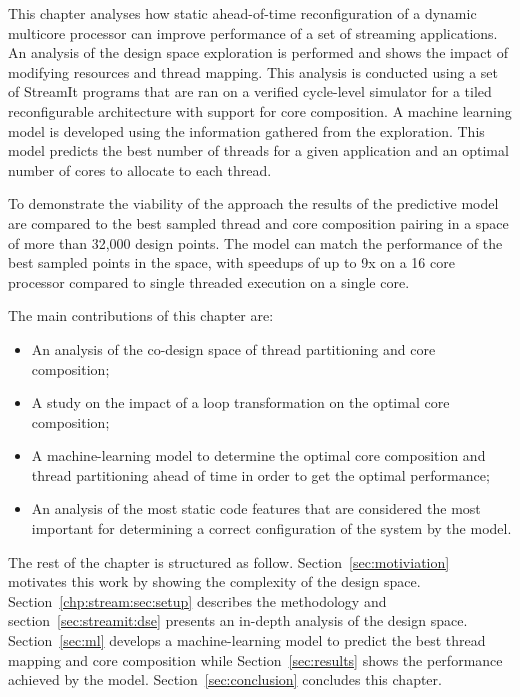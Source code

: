 This chapter analyses how static ahead-of-time reconfiguration of a dynamic multicore processor can improve performance of a set of streaming applications.
An analysis of the design space exploration is performed and shows the impact of modifying resources and thread mapping.
This analysis is conducted using a set of StreamIt programs that are ran on a verified cycle-level simulator for a tiled reconfigurable architecture with support for core composition.
A machine learning model is developed using the information gathered from the exploration.
This model predicts the best number of threads for a given application and an optimal number of cores to allocate to each thread.

To demonstrate the viability of the approach the results of the predictive model are compared to the best sampled thread and core composition pairing in a space of more than 32,000 design points.
The model can match the performance of the best sampled points in the space, with speedups of up to 9x on a 16 core processor compared to single threaded execution on a single core. 

The main contributions of this chapter are:
\begin{itemize}
\item An analysis of the co-design space of thread partitioning and core composition;
\vspace{-1em}
\item A study on the impact of a loop transformation on the optimal core composition;
\vspace{-1em}
\item A machine-learning model to determine the optimal core composition and thread partitioning ahead of time in order to get the optimal performance;
\vspace{-1em}
\item An analysis of the most static code features that are considered the most important for determining a correct configuration of the system by the model.
\end{itemize}


The rest of the chapter is structured as follow.
Section~\ref{sec:motiviation} motivates this work by showing the complexity of the design space.
Section~\ref{chp:stream:sec:setup} describes the methodology and section~\ref{sec:streamit:dse} presents an in-depth analysis of the design space.
Section~\ref{sec:ml} develops a machine-learning model to predict the best thread mapping and core composition while Section~\ref{sec:results} shows the performance achieved by the model.
Section~\ref{sec:conclusion} concludes this chapter.

